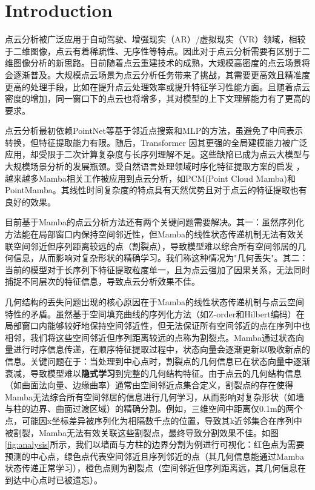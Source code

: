 \documentclass[preprint,12pt]{elsarticle}
\begin{document}
\section{Introduction}
\label{sec1}

点云分析被广泛应用于自动驾驶、增强现实（AR）/虚拟现实（VR）领域，相较于二维图像，点云有着稀疏性、无序性等特点。因此对于点云分析需要有区别于二维图像分析的新思路。目前随着点云重建技术的成熟，大规模高密度的点云场景将会逐渐普及。大规模点云场景为点云分析任务带来了挑战\cite{Vertex}，其需要更高效且精准度更高的处理手段，比如在提升点云处理效率或提升特征学习性能方面。且随着点云密度的增加，同一窗口下的点云也将增多，其对模型的上下文理解能力有了更高的要求。

点云分析最初依赖PointNet\cite{pointnet,PointNet++}等基于邻近点搜索和MLP的方法，虽避免了中间表示转换，但特征提取能力有限。随后，Transformer\cite{pt,ptv3,superpoint} 因其更强的全局建模能力被广泛应用，却受限于二次计算复杂度与长序列理解不足。这些缺陷已成为点云大模型与大规模场景分析的发展瓶颈。受自然语言处理领域时序化特征提取方案的启发 \cite{ssm,Mamba,Lstm}，越来越多Mamba\cite{Mamba,VisionMamba}相关工作被应用到点云分析，如PCM(Point Cloud Mamba)\cite{pcm}和PointMamba\cite{PointMamba}。其线性时间复杂度的特点具有天然优势且对于点云的特征提取也有良好的效果。

目前基于Mamba的点云分析方法还有两个关键问题需要解决。其一：虽然序列化方法能在局部窗口内保持空间邻近性，但Mamba的线性状态传递机制无法有效关联空间邻近但序列距离较远的点（割裂点），导致模型难以综合所有空间邻居的几何信息，从而影响对复杂形状的精确学习。我们称这种情况为"几何丢失"。其二：当前的模型对于长序列下特征提取粒度单一，且为点云强加了因果关系，无法同时捕捉不同层次的特征信息，导致点云分析效果不佳。

几何结构的丢失问题出现的核心原因在于Mamba的线性状态传递机制与点云空间特性的矛盾。虽然基于空间填充曲线的序列化方法（如Z-order和Hilbert编码）在局部窗口内能够较好地保持空间邻近性，但无法保证所有空间邻近的点在序列中也相邻，我们将这些空间邻近但序列距离较远的点称为割裂点。Mamba通过状态向量进行时序信息传递，在顺序特征提取过程中，状态向量会逐渐更新以吸收新点的信息。关键问题在于：当处理到中心点时，割裂点的几何信息已在状态向量中逐渐衰减，导致模型难以\textbf{隐式学习}到完整的几何结构特征。由于点云的几何结构信息（如曲面法向量、边缘曲率）通常由空间邻近点集合定义，割裂点的存在使得Mamba无法综合所有空间邻居的信息进行几何学习，从而影响对复杂形状（如墙与柱的边界、曲面过渡区域）的精确分割。例如，三维空间中距离仅0.1m的两个点，可能因x坐标差异被序列化为相隔数千点的位置，导致其k近邻集合在序列中被割裂，Mamba无法有效关联这些割裂点，最终导致分割效果不佳。如图\ref{fig:analysis}所示，我们以墙面与方柱的边界分割为例进行可视化：红色点为需要预测的中心点，绿色点代表空间邻近且序列邻近的点（其几何信息能通过Mamba状态传递正常学习），橙色点则为割裂点（空间邻近但序列距离远，其几何信息在到达中心点时已被遗忘）。
\end{document}
